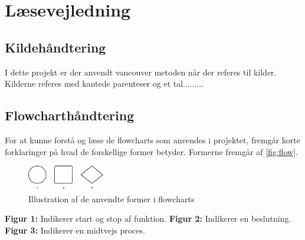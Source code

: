\section{Læsevejledning}



\subsection{Kildehåndtering}
I dette projekt er der anvendt vancouver metoden når der referes til kilder. Kilderne referes med kantede parenteser og et tal.........



\subsection{Flowcharthåndtering}
For at kunne forstå og læse de flowcharts som anvendes i projektet, fremgår korte forklaringer på hvad de forskellige former betyder. Formerne fremgår af \autoref{fig:flow}.

\begin{figure}[H]
\centering
\includegraphics[width=0.3\textwidth]{figures/flow}
\caption{Illustration af de anvendte former i flowcharts}
\label{fig:flow}
\end{figure}

\textbf{Figur 1:} Indikerer start og stop af funktion.
\textbf{Figur 2:} Indikerer en beslutning.
\textbf{Figur 3:} Indikerer en midtvejs proces.